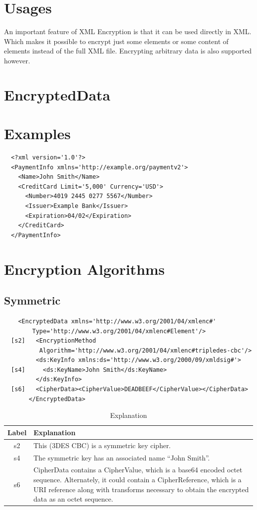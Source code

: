 \section{Usages}
An important feature of XML Encryption is that it can be used directly in XML\@.
Which makes it possible to encrypt just some elements or some content of
elements instead of the full XML file. Encrypting arbitrary data is also
supported however.
\section{EncryptedData}
\section{Examples}
\begin{verbatim}
  <?xml version='1.0'?>
  <PaymentInfo xmlns='http://example.org/paymentv2'>
    <Name>John Smith</Name>
    <CreditCard Limit='5,000' Currency='USD'>
      <Number>4019 2445 0277 5567</Number>
      <Issuer>Example Bank</Issuer>
      <Expiration>04/02</Expiration>
    </CreditCard>
  </PaymentInfo>
\end{verbatim}
\section{Encryption Algorithms}
\subsection{Symmetric}
\begin{verbatim}
    <EncryptedData xmlns='http://www.w3.org/2001/04/xmlenc#'
        Type='http://www.w3.org/2001/04/xmlenc#Element'/>
  [s2]   <EncryptionMethod
          Algorithm='http://www.w3.org/2001/04/xmlenc#tripledes-cbc'/>
         <ds:KeyInfo xmlns:ds='http://www.w3.org/2000/09/xmldsig#'>
  [s4]     <ds:KeyName>John Smith</ds:KeyName>
         </ds:KeyInfo>
  [s6]   <CipherData><CipherValue>DEADBEEF</CipherValue></CipherData>
       </EncryptedData>
\end{verbatim}

\begin{table}
    \begin{tabulary}{\textwidth}{cL}
        \toprule
        Label & Explanation \\
        \midrule
        s2 & This (3DES CBC) is a symmetric key cipher. \\

        s4 & The symmetric key has an associated name “John Smith”. \\

        s6 & CipherData contains a CipherValue, which is a base64 encoded octet
        sequence. Alternately, it could contain a CipherReference, which is a
        URI reference along with transforms necessary to obtain the encrypted
        data as an octet sequence. \\
        \bottomrule
    \end{tabulary}
    \caption{Explanation}
\end{table}

